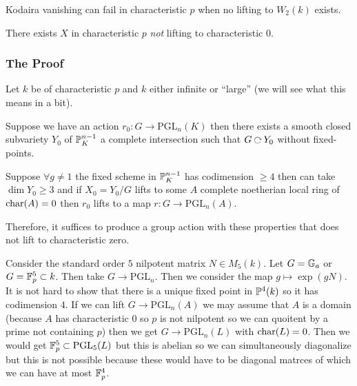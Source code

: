 \documentclass[12pt]{article}
\begin{document}
\begin{thm}[Raynaud]
Kodaira vanishing can fail in characteristic $p$ when no lifting to $W_2(k)$ exists.
\end{thm}

\begin{thm}[Serre]
There exists $X$ in characteristic $p$ \textit{not} lifting to characteristic $0$.
\end{thm}

\subsubsection{The Proof}

\renewcommand{\PGL}{\mathrm{PGL}}

Let $k$ be of characteristic $p$ and $k$ either infinite or ``large'' (we will see what this means in a bit). 

\begin{prop}[Godeaux]
Suppose we have an action $r_0 : G \to \PGL_n(K)$ then there exists a smooth closed subvariety $Y_0$ of $\P^{n-1}_K$ a complete intersection such that $G \acts Y_0$ without fixed-points. 
\end{prop}

\begin{prop}[Serre]
Suppose $\forall g \neq 1$ the fixed scheme in $\P^{n-1}_K$ has codimension $\ge 4$ then can take $\dim{Y_0} \ge 3$ and if $X_0 = Y_0 /G$ lifts to some $A$ complete noetherian local ring of $\ch(A) = 0$ then $r_0$ lifts to a map $r : G \to \PGL_n(A)$.
\end{prop}

\begin{rmk}
Therefore, it suffices to produce a group action with these properties that does not lift to characteristic zero.
\end{rmk}

Consider the standard order $5$ nilpotent matrix $N \in M_5(k)$. Let $G = \Ga$ or $G = \FF_p^5 \subset k$. Then take $G \to \PGL_n$. Then we consider the map $g \mapsto \exp{(gN)}$. It is not hard to show that there is a unique fixed point in $\P^4(k)$ so it has codimension $4$. If we can lift $G \to \PGL_n(A)$ we may assume that $A$ is a domain (because $A$ has characteristic $0$ so $p$ is not nilpotent so we can quoitent by a prime not containing $p$) then we get $G \to \PGL_n(L)$ with $\ch(L) = 0$. Then we would get $\FF_p^5 \subset \PGL_5(L)$ but this is abelian so we can simultaneously diagonalize but this is not possible because these would have to be diagonal matrces of which we can have at most $\FF_p^4$. 
\end{document}
